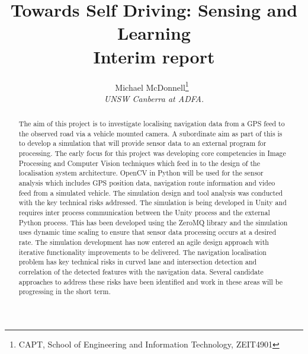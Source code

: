 \documentclass[]{aiaa-tc}%
\title{Towards Self Driving: Sensing and Learning\\ Interim report}
\author{
  Michael McDonnell\thanks{CAPT, School of Engineering and Information Technology, ZEIT4901}\
  \\
  {\normalsize\itshape
   UNSW Canberra at ADFA.}\\
  }
\begin{document}
\maketitle


\begin{abstract}
The aim of this project is to investigate localising navigation data from a GPS feed to the observed road via a vehicle mounted camera. A subordinate aim as part of this is to develop a simulation that will provide sensor data to an external program for processing. 
The early focus for this project was developing core competencies in Image Processing and Computer Vision techniques which feed in to the design of the localisation system architecture. OpenCV in Python will be used for the sensor analysis which includes GPS position data, navigation route information and video feed from a simulated vehicle.
The simulation design and tool analysis was conducted with the key technical risks addressed. The simulation is being developed in Unity and requires inter process communication between the Unity process and the external Python process. This has been developed using the ZeroMQ library and the simulation uses dynamic time scaling to ensure that sensor data processing occurs at a desired rate. The simulation development has now entered an agile design approach with iterative functionality improvements to be delivered.
The navigation localisation problem has key technical risks in curved lane and intersection detection and correlation of the detected features with the navigation data. Several candidate approaches to address these risks have been identified and work in these areas will be progressing in the short term.
\end{abstract}

\newpage
\tableofcontents


%
\end{document}
